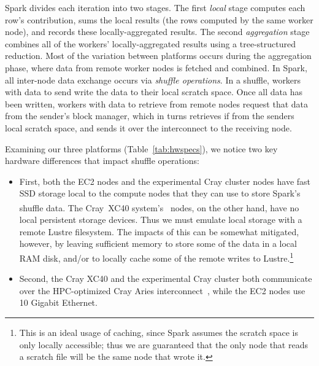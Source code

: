 Spark divides each iteration into two stages.  The first \emph{local} stage computes each row's contribution, sums the local results (the rows computed by the same worker node), and records these locally-aggregated results.  The second \emph{aggregation} stage combines all of the workers' locally-aggregated results using a tree-structured reduction.  Most of the variation between platforms occurs during the aggregation phase, where data from remote worker nodes is fetched and combined.  In Spark, all inter-node data exchange occurs via \emph{shuffle operations}.  In a shuffle, workers with data to send write the data to their local scratch space.  Once all data has been written, workers with data to retrieve from remote nodes request that data from the sender's block manager, which in turns retrieves if from the senders local scratch space, and sends it over the interconnect to the receiving node.

Examining our three platforms (Table~\ref{tab:hwspecs}), we notice two key hardware differences that impact shuffle operations:
\begin{itemize}
\item First, both the EC2 nodes and the experimental Cray cluster nodes have fast SSD storage local to the compute nodes that they can use to store Spark's shuffle data.  
The Cray\textregistered~XC40\textsuperscript{\tiny\texttrademark} system's~\cite{alverson2012cray,craycascadesc12} nodes, on the other hand, have no local persistent storage devices.  Thus we must emulate local storage with a remote Lustre filesystem.  The impacts of this can be somewhat mitigated, however, by leaving sufficient memory to store some of the data in a local RAM disk, and/or to locally cache some of the remote writes to Lustre.\footnote{This is an ideal usage of caching, since Spark assumes the scratch space is only locally accessible; thus we are guaranteed that the only node that reads a scratch file will be the same node that wrote it.}  
\item Second, the Cray XC40 and the experimental Cray cluster both communicate over the HPC-optimized Cray Aries 
interconnect~\cite{alverson2012cray,craycascadesc12}, while the EC2 nodes use 10 Gigabit Ethernet.
\end{itemize}  

